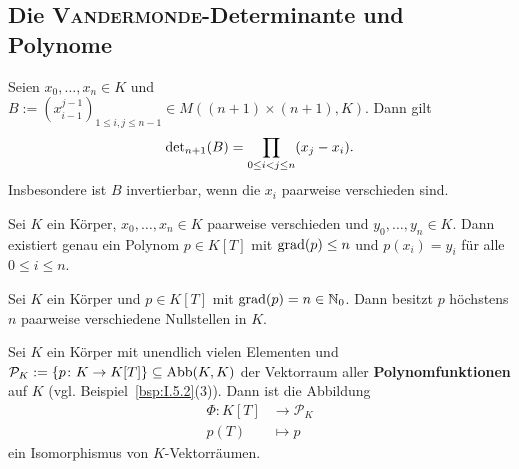 \subsection{Die \textsc{Vandermonde}-Determinante und Polynome}

\begin{satz}
	\label{satz:I.15.1}
	Seien $x_0,\dots,x_n \in K$ und $B := (x_{i-1}^{j-1})_{1 \leq i,j \leq n-1} \in M((n+1) \times (n+1),K)$.
	Dann gilt 
	\[
		\operatorname{\det\,\!}_{n+1}(B) = \prod_{0 \leq i<j \leq n} (x_j-x_i).
	\]
	Insbesondere ist $B$ invertierbar, wenn die $x_i$ paarweise verschieden sind.
\end{satz}

\setcounter{satz}{2}
\begin{korollar}
	\label{kor:I.15.3}
	Sei $K$ ein Körper, $x_0, \dots, x_n \in K$ paarweise verschieden und $y_0, \dots, y_n \in K$.
	Dann existiert genau ein Polynom $p \in K[T]$ mit $\operatorname{grad}(p) \leq n$ und $p(x_i)=y_i$ für alle $0 \leq i \leq n$.
\end{korollar}

\begin{korollar}
	\label{kor:I.15.4}
	Sei $K$ ein Körper und $p \in K[T]$ mit $\operatorname{grad}(p) = n \in \mathbb{N}_0$.
	Dann besitzt $p$ höchstens $n$ paarweise verschiedene Nullstellen in $K$.
\end{korollar}

\setcounter{satz}{5}
\begin{satz}
	\label{satz:I.15.6}
	Sei $K$ ein Körper mit unendlich vielen Elementen und $\mathcal{P}_K := \{p \colon K \rightarrow K[T]\} \subseteq \operatorname{Abb}(K,K)$ der Vektorraum aller \textbf{Polynomfunktionen} auf $K$ (vgl. Beispiel~\ref{bsp:I.5.2}(3)). 
	Dann ist die Abbildung
	\begin{align*}
		\Phi \colon K[T] &\longrightarrow \mathcal{P}_K \\
		p(T) &\longmapsto p
	\end{align*}
	ein Isomorphismus von $K$-Vektorräumen.
\end{satz}
\cleardoubleoddemptypage